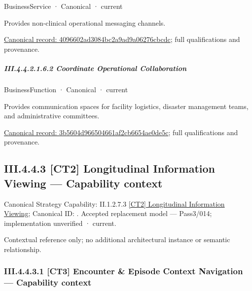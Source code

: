 \label{element:4096602ad3084bc2a9ad9a06276cbcdc}
{\small BusinessService · Canonical · current}\par

Provides non-clinical operational messaging channels.


{\footnotesize \href{../../../../../../../../continuum/business/business-service/4096602ad3084bc2a9ad9a06276cbcdc.md}{Canonical record: 4096602ad3084bc2a9ad9a06276cbcdc}; full qualifications and provenance.}\par
\subparagraph*{III.4.4.2.1.6.2 Coordinate Operational Collaboration}
\label{navigation:III.4.4.2.1.6.2}

\label{element:3b5604d966504661af2cb6654ae0de5c}
{\small BusinessFunction · Canonical · current}\par

Provides communication spaces for facility logistics, disaster management teams, and administrative committees.


{\footnotesize \href{../../../../../../../../continuum/business/business-function/3b5604d966504661af2cb6654ae0de5c.md}{Canonical record: 3b5604d966504661af2cb6654ae0de5c}; full qualifications and provenance.}\par
\subsection*{III.4.4.3 [CT2] Longitudinal Information Viewing — Capability context}
\label{navigation:III.4.4.3}

{\small Canonical Strategy Capability: II.1.2.7.3 \hyperref[element:b47f58042730497daf37e418ac865bb3]{[CT2] Longitudinal Information Viewing}; Canonical ID: \texttt{}. Accepted replacement model — Pass3/014; implementation unverified · current.}\par
Contextual reference only; no additional architectural instance or semantic relationship.\par
\subsubsection*{III.4.4.3.1 [CT3] Encounter \& Episode Context Navigation — Capability context}
\label{navigation:III.4.4.3.1}

